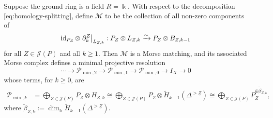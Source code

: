 \documentclass[a4paper,leqno]{amsart}
\begin{document}
\begin{thm}\label{thm:minimal-resolution}
Suppose the ground ring is a field $R=\Bbbk$. With respect to the decomposition \eqref{eq:homology-splitting}, define $\mathcal M$ to be the collection of all non-zero components of 
\begin{equation}
 \operatorname{id}_{P_Z}\otimes\left.\partial^Z_k\right|_{L_{Z,k}}:
 P_Z\otimes L_{Z,k}\xrightarrow{\sim}P_Z\otimes B_{Z,k-1}
 \label{eq:morse-matching}
\end{equation}
for all $Z\in \mathcal{J}(P)$ and all $k\ge 1$.
Then $\mathcal M$ is a Morse matching, and its associated Morse complex defines a minimal projective resolution
\[
 \cdots\longrightarrow\mathcal P_{\min,2}
 \longrightarrow\mathcal P_{\min,1}
 \longrightarrow\mathcal P_{\min,0}
 \longrightarrow I_X\longrightarrow0
\]
whose terms, for $k\geq0$, are
\begin{equation}
 \begin{aligned}
 \mathcal P_{\min,k}
 &=\bigoplus_{Z\in\mathcal J(P)}P_Z\otimes H_{Z,k} \cong\bigoplus_{Z\in\mathcal J(P)}
 P_Z\otimes\widetilde H_{k-1}(\Delta^{>\underline{Z}})
 \cong\bigoplus_{Z\in\mathcal J(P)}
 P_Z^{\oplus\widetilde\beta_{Z,k}},
 \end{aligned}
 \label{eq:minimal-terms}
\end{equation}
where $\widetilde\beta_{Z,k}:= \dim_{\Bbbk}\widetilde H_{k-1}(\Delta^{>\underline{Z}})$.
\end{thm}
\end{document}
